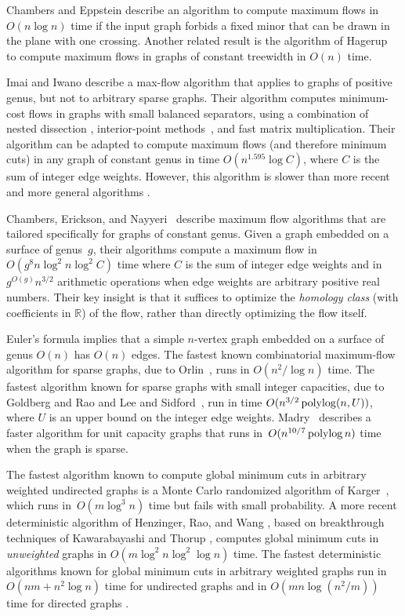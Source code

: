 \documentclass[letterpaper,review]{siamart190516}
\def\Real{\mathbb{R}}
\begin{document}
Chambers and Eppstein \cite{ce-focmf-13} describe an algorithm to compute maximum flows in $O(n\log n)$ time if the input graph forbids a fixed minor that can be drawn in the plane with one crossing.  Another related result is the algorithm of Hagerup \etal~\cite{hknr-cmfnc-98} to compute maximum flows in graphs of constant treewidth in $O(n)$ time.

Imai and Iwano \cite{ii-espap-90} describe a max-flow algorithm that applies to graphs of positive genus, but not to arbitrary sparse graphs.
Their algorithm computes minimum-cost flows in graphs with small balanced separators, using a combination of nested dissection \cite{lrt-gnd-79, pr-fepss-93}, interior-point methods~\cite{v-slpfm-89}, and fast matrix multiplication.
Their algorithm can be adapted to compute maximum flows (and therefore minimum cuts) in any graph of constant genus in time $O(n^{1.595}\log C)$, where $C$ is the sum of integer edge weights.
However, this algorithm is slower than more recent and more general algorithms \cite{ds-flgfi-08, gr-bfdb-98}.

Chambers, Erickson, and Nayyeri~\cite{cen-hfcc-12} describe maximum flow algorithms that are tailored specifically for graphs of constant genus.
Given a graph embedded on a surface of genus~$g$, their algorithms compute a maximum flow in  $O(g^8 n \log^2 n \log^2 C)$ time where $C$ is the sum of integer edge weights and in $g^{O(g)}n^{3/2}$ arithmetic operations when edge weights are arbitrary positive real numbers.  Their key insight is that it suffices to optimize the \emph{homology class} (with coefficients in $\Real$) of the flow, rather than directly optimizing the flow itself.

Euler's formula implies that a simple $n$-vertex graph embedded on a surface of genus $O(n)$ has $O(n)$ edges.
The fastest known combinatorial maximum-flow algorithm for sparse graphs, due to Orlin~\cite{o-mfotl-13}, runs in $O(n^2 / \log n)$ time.
The fastest algorithm known for sparse graphs with small integer capacities, due to Goldberg and Rao
\cite{gr-bfdb-98} and Lee and Sidford~\cite{ls-pfmlp-14}, run in time $O(n^{3/2} \operatorname{polylog}(n, U))$, where $U$ is an upper bound on the integer edge weights.
Madry~\cite{m-ncpef-13} describes a faster algorithm for unit capacity graphs that runs
in~$O(n^{10/7} \operatorname{polylog} n)$ time when the graph is sparse.

The fastest algorithm known to compute global minimum cuts in arbitrary weighted undirected graphs is a Monte Carlo randomized algorithm of Karger~\cite{k-mcnlt-00}, which runs in~$O(m \log^3 n)$ time but fails with small probability. 
A more recent deterministic algorithm of Henzinger, Rao, and Wang \cite{hrw-lfpfe-17}, based on breakthrough techniques of Kawarabayashi and Thorup \cite{kt-dgmcs-15,kt-decnt-18}, computes global minimum cuts in \emph{unweighted} graphs in $O(m \log^2 n \log^2 \log n)$ time.
The fastest deterministic algorithms known for global minimum cuts in arbitrary weighted graphs run in $O(nm + n^2\log n)$ time for undirected graphs \cite{ni-cemcg-92,f-eani-94,sw-sma-97} and in $O(mn \log(n^2/m))$ time for directed graphs \cite{ho-fafmd-94}.
\end{document}
